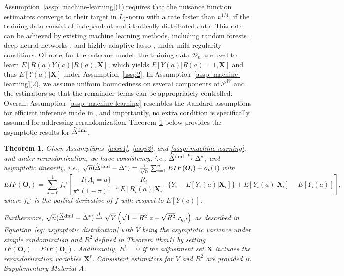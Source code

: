 \documentclass[12pt]{article}
\newtheorem{theorem}{Theorem}
\newcommand{\bX}{\boldsymbol{X}}\newcommand{\bO}{\boldsymbol{O}}
\begin{document}
{Assumption~\ref{assp: machine-learning}(1) requires that the nuisance function estimators converge to their target in $L_2$-norm with a rate faster than $n^{1/4}$, if the training data consist of independent and identically distributed data. This rate can be achieved by existing machine learning methods, including random forests \citep{wager2018estimation}, deep neural networks \citep{Farrell2021}, and highly adaptive lasso \citep{benkeser2016highly}, under mild regularity conditions. 
Of note, for the outcome model, the training data $\mathcal{D}_n$ are used to learn  $E[R(a)Y(a)|R(a), \bX]$, which yields $E[Y(a)|R(a)=1, \bX]$ and thus $E[Y(a)|\bX]$ under Assumption~\ref{assp2}.
In Assumption~\ref{assp: machine-learning}(2), we assume uniform boundedness on several components of $\mathcal{P}^W$ and the estimators so that the remainder terms can be appropriately controlled. Overall, Assumption~\ref{assp: machine-learning} resembles the standard assumptions for efficient inference made in \cite{chernozhukov2018double}, and importantly, no extra condition is specifically assumed for addressing rerandomization. Theorem~\ref{thm: ml-rerandomization} below provides the asymptotic results for $\widehat{\Delta}^{\textup{dml}}$.

\begin{theorem}\label{thm: ml-rerandomization}
 Given Assumptions~\ref{assp1}, \ref{assp2}, and \ref{assp: machine-learning}, and under rerandomization, we have consistency, i.e., $\widehat{\Delta}^{\textup{dml}} \xrightarrow{p} \Delta^*$, and asymptotic linearity, i.e., $\sqrt{n}(\widehat{\Delta}^{\textup{dml}}-\Delta^*) = \frac{1}{\sqrt{n}} \sum_{i=1}^n EIF(\bO_i) + o_p(1)$ with 
\begin{equation}\label{eq: eif}
    EIF(\bO_i) = \sum_{a=0}^1 f_a' \left[\frac{I\{A_i=a\}}{\pi^a(1-\pi)^{1-a}}\frac{R_i}{E[R_i(a)|\bX_i]}\{Y_i - E[Y_i(a)|\bX_i]\} + E[Y_i(a)|\bX_i] - E[Y_i(a)]\right],
\end{equation}
where $f_a'$ is the partial derivative of $f$ with respect to $E[Y(a)]$.

Furthermore, $\sqrt{n}(\widehat{\Delta}^{\textup{dml}}-\Delta^*) \xrightarrow{d} \sqrt{V}\left(\sqrt{1-R^2}\ z + \sqrt{R^2}\ r_{q,t}\right)$ as described in Equation~\eqref{eq: asymptotic distribution} with $V$ being the asymptotic variance under simple randomization and $R^2$ defined in Theorem \ref{thm1} by setting $IF(\bO_i)=EIF(\bO_i)$. Additionally, $R^2=0$ if the adjustment set $\bX$ includes the rerandomization variables $\bX^r$. Consistent estimators for $V$ and $R^2$ are provided in Supplementary Material A.
\end{theorem}

}
\end{document}
